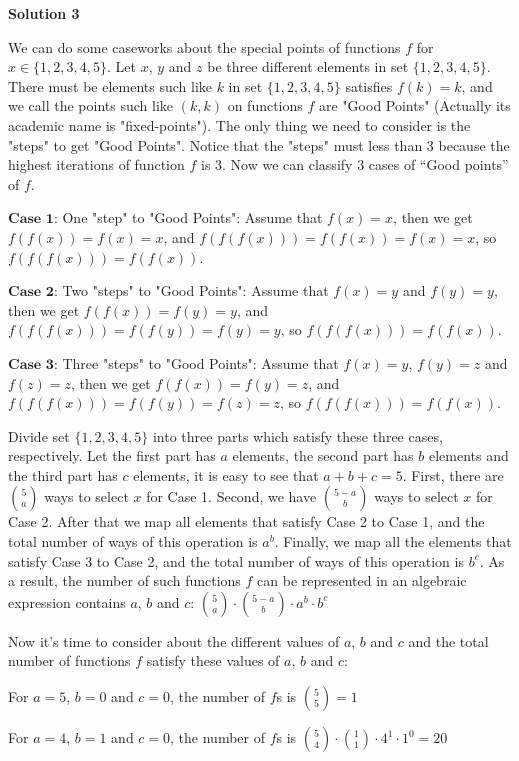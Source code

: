 \begin{enumerate}
\textbf{Solution 3}

We can do some caseworks about the special points of functions $f$ for $x\in\{1,2,3,4,5\}$. Let $x$, $y$ and $z$ be three different elements in set $\{1,2,3,4,5\}$. There must be elements such like $k$ in set $\{1,2,3,4,5\}$ satisfies $f(k)=k$, and we call the points such like $(k,k)$ on functions $f$ are "Good Points" (Actually its academic name is "fixed-points"). The only thing we need to consider is the "steps" to get  "Good Points". Notice that the "steps" must less than $3$ because the highest iterations of function $f$ is $3$. Now we can classify $3$ cases of “Good points” of $f$.

 $\textbf{Case 1:}$ One "step" to "Good Points": Assume that $f(x)=x$, then we get $f(f(x))=f(x)=x$, and $f(f(f(x)))=f(f(x))=f(x)=x$, so $f(f(f(x)))=f(f(x))$.

 $\textbf{Case 2:}$ Two "steps" to "Good Points": Assume that $f(x)=y$ and $f(y)=y$, then we get $f(f(x))=f(y)=y$, and $f(f(f(x)))=f(f(y))=f(y)=y$, so $f(f(f(x)))=f(f(x))$.

 $\textbf{Case 3:}$ Three "steps" to "Good Points": Assume that $f(x)=y$, $f(y)=z$ and $f(z)=z$, then we get $f(f(x))=f(y)=z$, and $f(f(f(x)))=f(f(y))=f(z)=z$, so $f(f(f(x)))=f(f(x))$.

 Divide set $\{1,2,3,4,5\}$ into three parts which satisfy these three cases, respectively. Let the first part has $a$ elements, the second part has $b$ elements and the third part has $c$ elements, it is easy to see that $a+b+c=5$. First, there are $\binom{5}{a}$ ways to select $x$ for Case 1. Second, we have $\binom{5-a}{b}$ ways to select $x$ for Case 2. After that we map all elements that satisfy Case 2 to Case 1, and the total number of ways of this operation is $a^b$. Finally, we map all the elements that satisfy Case 3 to Case 2, and the total number of ways of this operation is $b^c$. As a result, the number of such functions $f$ can be represented in an algebraic expression contains $a$, $b$ and $c$: $\boxed{\binom{5}{a}\cdot \binom{5-a}{b}\cdot a^b\cdot b^c}$

 Now it's time to consider about the different values of $a$, $b$ and $c$ and the total number of functions $f$ satisfy these values of $a$, $b$ and $c$:

 For $a=5$, $b=0$ and $c=0$, the number of $f$s is $\binom{5}{5}=1$

 For $a=4$, $b=1$ and $c=0$, the number of $f$s is $\binom{5}{4}\cdot \binom{1}{1}\cdot 4^1\cdot 1^0=20$


\end{enumerate}
